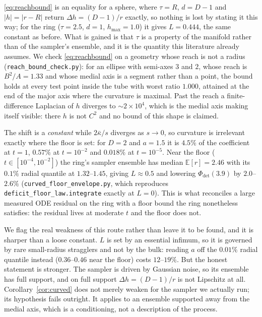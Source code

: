 \documentclass[11pt]{article}
\theoremstyle{remark}
\newcommand{\kb}{\bar\kappa}
\newcommand{\E}{\mathbb{E}}
\begin{document}
\eqref{eq:reachbound} is an equality for a sphere, where $\tau=R$, $d=D-1$ and $|h|=|r-R|$
return $\Delta h=(D-1)/r$ exactly, so nothing is lost by stating it this way; for the ring
($\tau=2.5$, $d=1$, $h_{\max}=1.0$) it gives $L=0.444$, the same constant as before. What is
gained is that $\tau$ is a property of the manifold rather than of the sampler's ensemble,
and it is the quantity this literature already assumes. We check
\eqref{eq:reachbound} on a geometry whose reach is not a radius
(\texttt{reach\_bound\_check.py}): for an ellipse with semi-axes $3$ and $2$, whose reach is
$B^2/A=1.33$ and whose medial axis is a segment rather than a point, the bound holds at
every test point inside the tube with worst ratio $1.000$, attained at the end of the major
axis where the curvature is maximal. Past the reach a finite-difference Laplacian of $h$
diverges to ${\sim}2\times10^{4}$, which is the medial axis making itself visible: there $h$
is not $C^2$ and no bound of this shape is claimed.

The shift is a \emph{constant} while $2\kb/s$ diverges as $s\to0$, so curvature is
irrelevant exactly where the floor is set: for $D=2$ and $a=1.5$ it is $4.5\%$ of the
coefficient at $t=1$, $0.57\%$ at $t=10^{-2}$ and $0.018\%$ at $t=10^{-5}$. Near the floor
($t\in[10^{-4},10^{-2}]$) the ring's sampler ensemble has median $\E[r]=2.46$ with its
$0.1\%$ radial quantile at $1.32$--$1.45$, giving $L\approx0.5$ and lowering
$\Phi_{\det}(3.9)$ by $2.0$--$2.6\%$ (\texttt{curved\_floor\_envelope.py}, which reproduces
\texttt{deficit\_floor\_law.integrate} exactly at $L=0$). This is what reconciles a large
measured ODE residual on the ring with a floor bound the ring nonetheless satisfies: the
residual lives at moderate $t$ and the floor does not.

We flag the real weakness of this route rather than leave it to be found, and it is sharper
than a loose constant. $L$ is set by an essential infimum, so it is governed by rare
small-radius stragglers and not by the bulk: reading $a$ off the $0.01\%$ radial quantile
instead ($0.36$--$0.46$ near the floor) costs $12$--$19\%$. But the honest statement is
stronger. The sampler is driven by Gaussian noise, so its ensemble has full support, and on
full support $\Delta h=(D-1)/r$ is not Lipschitz at all. Corollary~\ref{cor:curved} does not
merely weaken for the sampler we actually run; its hypothesis fails outright. It applies to
an ensemble supported away from the medial axis, which is a conditioning, not a description
of the process.
\end{document}
